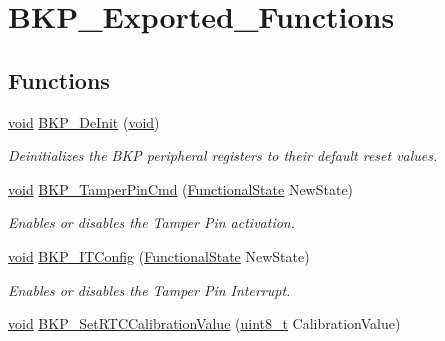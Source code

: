 \hypertarget{group___b_k_p___exported___functions}{}\section{B\+K\+P\+\_\+\+Exported\+\_\+\+Functions}
\label{group___b_k_p___exported___functions}
\subsection*{Functions}
\begin{DoxyCompactItemize}
\item 
\hyperlink{usb__devapi_8h_afabf60e7f57651d6d595a02c75f07cd0}{void} \hyperlink{group___b_k_p___exported___functions_gaabff4d8f5ebf4fd9a840bcc9042ca226}{B\+K\+P\+\_\+\+De\+Init} (\hyperlink{usb__devapi_8h_afabf60e7f57651d6d595a02c75f07cd0}{void})
\begin{DoxyCompactList}\small\item\em Deinitializes the B\+KP peripheral registers to their default reset values. \end{DoxyCompactList}\item 
\hyperlink{usb__devapi_8h_afabf60e7f57651d6d595a02c75f07cd0}{void} \hyperlink{group___b_k_p___exported___functions_ga3a0cdff9ad8238ade2c67e2b70f530ac}{B\+K\+P\+\_\+\+Tamper\+Pin\+Cmd} (\hyperlink{agilefox_2library_2inc_2stm32f10x__type_8h_ac9a7e9a35d2513ec15c3b537aaa4fba1}{Functional\+State} New\+State)
\begin{DoxyCompactList}\small\item\em Enables or disables the Tamper Pin activation. \end{DoxyCompactList}\item 
\hyperlink{usb__devapi_8h_afabf60e7f57651d6d595a02c75f07cd0}{void} \hyperlink{group___b_k_p___exported___functions_gab8dbd0c4773f6edb98a28c8ff6a2ead0}{B\+K\+P\+\_\+\+I\+T\+Config} (\hyperlink{agilefox_2library_2inc_2stm32f10x__type_8h_ac9a7e9a35d2513ec15c3b537aaa4fba1}{Functional\+State} New\+State)
\begin{DoxyCompactList}\small\item\em Enables or disables the Tamper Pin Interrupt. \end{DoxyCompactList}\item 
\hyperlink{usb__devapi_8h_afabf60e7f57651d6d595a02c75f07cd0}{void} \hyperlink{group___b_k_p___exported___functions_gad34db08a944450d2e7d56d0fd8db2bca}{B\+K\+P\+\_\+\+Set\+R\+T\+C\+Calibration\+Value} (\hyperlink{_p_e___types_8h_aba7bc1797add20fe3efdf37ced1182c5}{uint8\+\_\+t} Calibration\+Value)

\end{DoxyCompactItemize}
